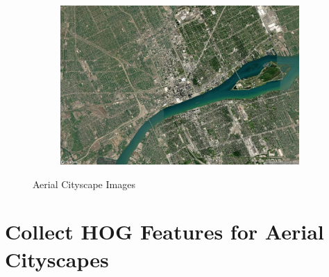 \documentclass[
  letterpaper,
  DIV=11,
  numbers=noendperiod]{scrreprt}
\begin{document}
\begin{figure}
\begin{minipage}{0.33\linewidth}
\begin{figure}[H]
{}


\end{figure}%

\end{minipage}%
%
\begin{minipage}{0.33\linewidth}

\begin{figure}[H]

{\centering \includegraphics{images/detroit_zoom_12.png}

}


\end{figure}%

\end{minipage}%

\caption{\label{fig-city-images}Aerial Cityscape Images}

\end{figure}%

\section{Collect HOG Features for Aerial
Cityscapes}\label{collect-hog-features-for-aerial-cityscapes}
\end{document}
